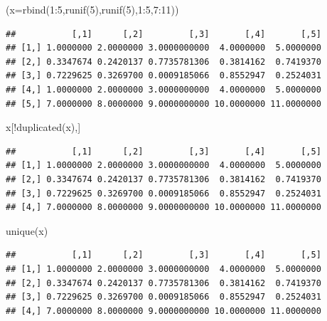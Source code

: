 \documentclass[
]{book}
\newenvironment{Shaded}{\begin{snugshade}}{\end{snugshade}}
\newcommand{\AttributeTok}[1]{\textcolor[rgb]{0.77,0.63,0.00}{#1}}
\newcommand{\DecValTok}[1]{\textcolor[rgb]{0.00,0.00,0.81}{#1}}
\newcommand{\FunctionTok}[1]{\textcolor[rgb]{0.00,0.00,0.00}{#1}}
\newcommand{\NormalTok}[1]{#1}
\newcommand{\SpecialCharTok}[1]{\textcolor[rgb]{0.00,0.00,0.00}{#1}}
\begin{document}
\begin{Shaded}
\begin{Highlighting}[]
\NormalTok{(}\AttributeTok{x=}\FunctionTok{rbind}\NormalTok{(}\DecValTok{1}\SpecialCharTok{:}\DecValTok{5}\NormalTok{,}\FunctionTok{runif}\NormalTok{(}\DecValTok{5}\NormalTok{),}\FunctionTok{runif}\NormalTok{(}\DecValTok{5}\NormalTok{),}\DecValTok{1}\SpecialCharTok{:}\DecValTok{5}\NormalTok{,}\DecValTok{7}\SpecialCharTok{:}\DecValTok{11}\NormalTok{))}
\end{Highlighting}
\end{Shaded}

\begin{verbatim}
##           [,1]      [,2]         [,3]       [,4]       [,5]
## [1,] 1.0000000 2.0000000 3.0000000000  4.0000000  5.0000000
## [2,] 0.3347674 0.2420137 0.7735781306  0.3814162  0.7419370
## [3,] 0.7229625 0.3269700 0.0009185066  0.8552947  0.2524031
## [4,] 1.0000000 2.0000000 3.0000000000  4.0000000  5.0000000
## [5,] 7.0000000 8.0000000 9.0000000000 10.0000000 11.0000000
\end{verbatim}

\begin{Shaded}
\begin{Highlighting}[]
\NormalTok{x[}\SpecialCharTok{!}\FunctionTok{duplicated}\NormalTok{(x),]}
\end{Highlighting}
\end{Shaded}

\begin{verbatim}
##           [,1]      [,2]         [,3]       [,4]       [,5]
## [1,] 1.0000000 2.0000000 3.0000000000  4.0000000  5.0000000
## [2,] 0.3347674 0.2420137 0.7735781306  0.3814162  0.7419370
## [3,] 0.7229625 0.3269700 0.0009185066  0.8552947  0.2524031
## [4,] 7.0000000 8.0000000 9.0000000000 10.0000000 11.0000000
\end{verbatim}

\begin{Shaded}
\begin{Highlighting}[]
\FunctionTok{unique}\NormalTok{(x)}
\end{Highlighting}
\end{Shaded}

\begin{verbatim}
##           [,1]      [,2]         [,3]       [,4]       [,5]
## [1,] 1.0000000 2.0000000 3.0000000000  4.0000000  5.0000000
## [2,] 0.3347674 0.2420137 0.7735781306  0.3814162  0.7419370
## [3,] 0.7229625 0.3269700 0.0009185066  0.8552947  0.2524031
## [4,] 7.0000000 8.0000000 9.0000000000 10.0000000 11.0000000
\end{verbatim}
\end{document}
